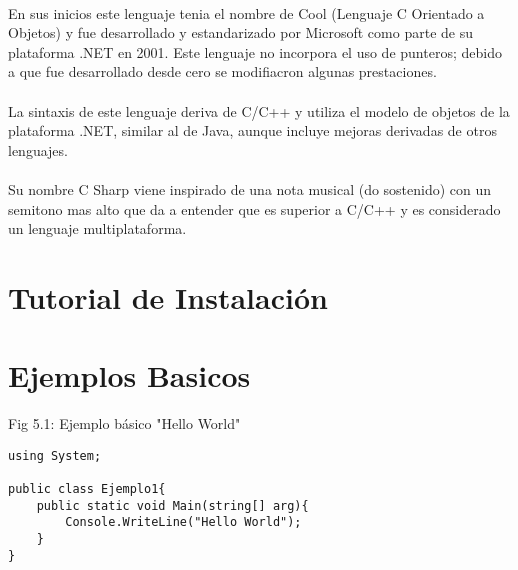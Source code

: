 \documentclass[11pt]{article} %
\begin{document}
\paragraph{ }
En sus inicios este lenguaje tenia el nombre de Cool (Lenguaje C Orientado a Objetos) y fue desarrollado y estandarizado por Microsoft como parte de su plataforma .NET en 2001. Este lenguaje no incorpora el uso de punteros; debido a que fue desarrollado desde cero se modifiacron algunas prestaciones.
\paragraph{ }
La sintaxis de este lenguaje deriva de C/C++ y utiliza el modelo de objetos de la plataforma .NET, similar al de Java, aunque incluye mejoras derivadas de otros lenguajes.
\paragraph{ }
Su nombre C Sharp viene inspirado de una nota musical (do sostenido) con un semitono mas alto que da a entender que es superior a  C/C++ y es considerado un lenguaje multiplataforma.

\section{Tutorial de Instalación}


\section{Ejemplos Basicos}


Fig 5.1: Ejemplo básico "Hello World"
\lstset{style=sharpc}
\begin{lstlisting}[frame=single]
using System;

public class Ejemplo1{
	public static void Main(string[] arg){
		Console.WriteLine("Hello World");
	}
}
\end{lstlisting}
\end{document}
